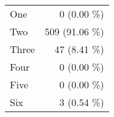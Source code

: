 \begin{tabular}{ l  r }
One & 0 (0.00 \%)\\
Two & 509 (91.06 \%)\\
Three & 47 (8.41 \%)\\
Four & 0 (0.00 \%)\\
Five & 0 (0.00 \%)\\
Six & 3 (0.54 \%)\\
\end{tabular}